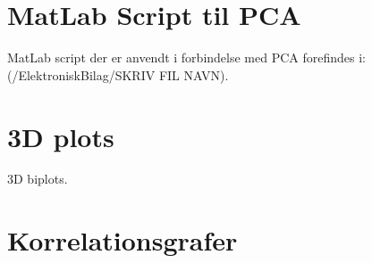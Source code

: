 \section{MatLab Script til PCA}
\label{ElektroniskBilagMatLabPCA}
%
MatLab script der er anvendt i forbindelse med PCA forefindes i: (/ElektroniskBilag/SKRIV FIL NAVN).


\section{3D plots}
\label{ElektroniskBilag3D}
3D biplots.


\section{Korrelationsgrafer}
\label{ElektroniskBilagKorrelationsgrafer}
%



